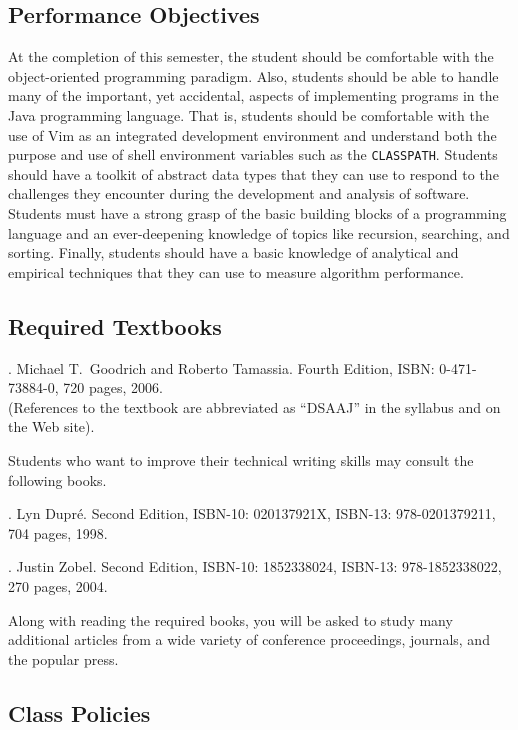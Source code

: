 \subsection*{Performance Objectives}

At the completion of this semester, the student should be comfortable with the object-oriented programming paradigm.
Also, students should be able to handle many of the important, yet accidental, aspects of implementing programs in the
Java programming language.  That is, students should be comfortable with the use of Vim as an integrated development
environment and understand both the purpose and use of shell environment variables such as the {\tt CLASSPATH}.
Students should have a toolkit of abstract data types that they can use to respond to the challenges they encounter
during the development and analysis of software.  Students must have a strong grasp of the basic building blocks of a
programming language and an ever-deepening knowledge of topics like recursion, searching, and sorting.  Finally,
students should have a basic knowledge of analytical and empirical techniques that they can use to measure algorithm
performance.

\subsection*{Required Textbooks}

. Michael T.\ Goodrich and Roberto Tamassia.
Fourth Edition, ISBN: 0-471-73884-0, 720 pages, 2006. \\
(References to the textbook are abbreviated as ``DSAAJ'' in the syllabus and on the Web site).

\noindent
Students who want to improve their technical writing skills may consult the following books.

. Lyn Dupr\'e. Second Edition,  ISBN-10: 020137921X,
ISBN-13: 978-0201379211, 704 pages, 1998.

.  Justin Zobel. Second Edition,  ISBN-10: 1852338024, ISBN-13:
978-1852338022, 270 pages, 2004.

\noindent
Along with reading the required books, you will be asked to study many additional articles from a wide variety of
conference proceedings, journals, and the popular press.

\subsection*{Class Policies}

